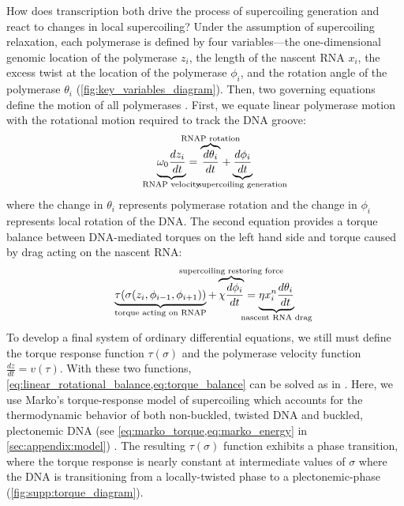 \documentclass[11pt]{article} %
\begin{document}
How does transcription both drive the process of supercoiling generation and react to changes in local supercoiling? Under the assumption of supercoiling relaxation, each polymerase is defined by four variables---the one-dimensional genomic location of the polymerase \(z_i\), the length of the nascent RNA \(x_i\), the excess twist at the location of the polymerase \(\phi_i\), and the rotation angle of the polymerase \(\theta_i\) (\cref{fig:key_variables_diagram}). Then, two governing equations define the motion of all polymerases \parencite{sevierPropertiesGeneExpression2018}. First, we equate linear polymerase motion with the rotational motion required to track the DNA groove:
\begin{equation}
    \underbrace{\omega_0 \frac{dz_i}{dt}}_{\mathclap{\text{RNAP velocity}}} = \overbrace{\frac{d\theta_i}{dt}}^{\mathclap{\text{RNAP rotation}}} + \underbrace{\frac{d\phi_i}{dt}}_{\mathclap{\text{supercoiling generation}}}
\label{eq:linear_rotational_balance}
\end{equation}
where the change in \(\theta_i\) represents polymerase rotation and the change in \(\phi_i\) represents local rotation of the DNA.
The second equation provides a torque balance between DNA-mediated torques on the left hand side and torque caused by drag acting on the nascent RNA:
\begin{equation}
    \underbrace{\tau(\sigma(z_i, \phi_{i-1}, \phi_{i+1}))}_{\mathclap{\text{torque acting on RNAP}}} + \overbrace{\chi \frac{d\phi_i}{dt}}^{\mathclap{\text{supercoiling restoring force}}}= \underbrace{\eta x_i^n \frac{d\theta_i}{dt}}_{\mathclap{\text{nascent RNA drag}}}
\label{eq:torque_balance}
\end{equation}
To develop a final system of ordinary differential equations, we still must define the torque response function \(\tau(\sigma)\) and the polymerase velocity function \(\frac{dz}{dt} = v(\tau)\). With these two functions, \cref{eq:linear_rotational_balance,eq:torque_balance} can be solved as in \textcite{sevierPropertiesGeneExpression2018}. Here, we use Marko's torque-response model of supercoiling which accounts for the thermodynamic behavior of both non-buckled, twisted DNA and buckled, plectonemic DNA (see \cref{eq:marko_torque,eq:marko_energy} in \cref{sec:appendix:model}) \parencite{markoTorqueDynamicsLinking2007}. The resulting \(\tau(\sigma)\) function exhibits a phase transition, where the torque response is nearly constant at intermediate values of \(\sigma\) where the DNA is transitioning from a locally-twisted phase to a plectonemic-phase (\cref{fig:supp:torque_diagram}).
\end{document}
